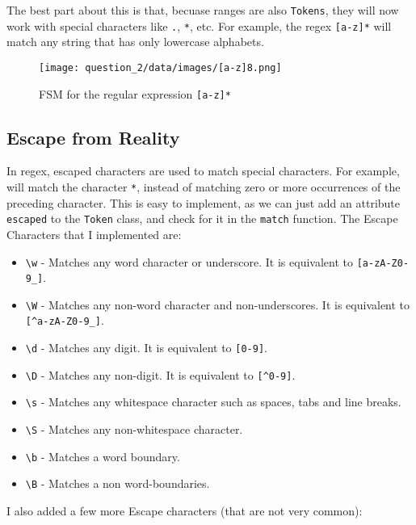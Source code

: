 \documentclass[12pt]{report}
\begin{document}
The best part about this is that, becuase ranges are also \texttt{Tokens}, they will now work with special characters like \texttt{.}, \texttt{*}, etc. For example, the regex \texttt{[a-z]*} will match any string that has only lowercase alphabets.

\begin{figure}[H]
    \centering
    \texttt{[image: question\_2/data/images/[a-z]8.png]}
    \caption{FSM for the regular expression \texttt{[a-z]*}}
\end{figure}

\subsection{Escape from Reality}

In regex, escaped characters are used to match special characters. For example, \texttt{\*} will match the character \texttt{*}, instead of matching zero or more occurrences of the preceding character. This is easy to implement, as we can just add an attribute \texttt{escaped} to the \texttt{Token} class, and check for it in the \texttt{match} function. The Escape Characters that I implemented are:
\begin{itemize}
    \item \texttt{\textbackslash w} - Matches any word character or underscore. It is equivalent to \texttt{[a-zA-Z0-9\_]}.
    \item \texttt{\textbackslash W} - Matches any non-word character and non-underscores. It is equivalent to \texttt{[\textasciicircum a-zA-Z0-9\_]}.
    \item \texttt{\textbackslash d} - Matches any digit. It is equivalent to \texttt{[0-9]}.
    \item \texttt{\textbackslash D} - Matches any non-digit. It is equivalent to \texttt{[\textasciicircum 0-9]}.
    \item \texttt{\textbackslash s} - Matches any whitespace character such as spaces, tabs and line breaks.
    \item \texttt{\textbackslash S} - Matches any non-whitespace character.
    \item \texttt{\textbackslash b} - Matches a word boundary.
    \item \texttt{\textbackslash B} - Matches a non word-boundaries.
\end{itemize}

I also added a few more Escape characters (that are not very common):
\end{document}

